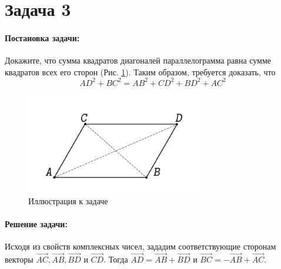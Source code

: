 {
   \section*{Задача 3}
   \paragraph{Постановка задачи:}
   Докажите, что сумма квадратов диагоналей параллелограмма
   равна сумме квадратов всех его сторон (Рис. \ref{t3:im}).
   Таким образом, требуется доказать, что
   \begin{equation}
      AD^2 + BC^2 = AB^2 +CD^2 + BD^2 + AC^2
      \label{t3:f1}
   \end{equation}
   \begin{figure}[h]
      \centering
      \includegraphics[width=0.7\textwidth]{images/task3.pdf}
      \caption{Иллюстрация к задаче}
      \label{t3:im}
   \end{figure}
   \paragraph{Решение задачи:}
   Исходя из свойств комплексных чисел, зададим соответствующие сторонам векторы \(\overrightarrow{AC},\overrightarrow{AB},\overrightarrow{BD}\) и \(\overrightarrow{CD}\). Тогда \(\overrightarrow{AD} = \overrightarrow{AB} + \overrightarrow{BD}\) и \(\overrightarrow{BC} = -\overrightarrow{AB} + \overrightarrow{AC}\).

}
